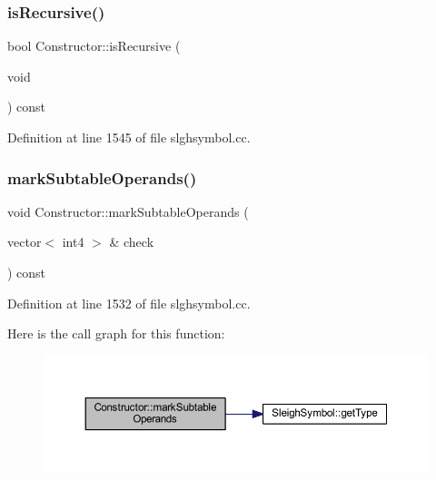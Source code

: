 \subsubsection{\texorpdfstring{isRecursive()}{isRecursive()}}
{\footnotesize\ttfamily bool Constructor\+::is\+Recursive (\begin{DoxyParamCaption}\item[{void}]{ }\end{DoxyParamCaption}) const}



Definition at line 1545 of file slghsymbol.\+cc.

\mbox{\label{class_constructor_a3a9bcc286d18c9d05de32509c5d6f0c4}} 
\subsubsection{\texorpdfstring{markSubtableOperands()}{markSubtableOperands()}}
{\footnotesize\ttfamily void Constructor\+::mark\+Subtable\+Operands (\begin{DoxyParamCaption}\item[{vector$<$ int4 $>$ \&}]{check }\end{DoxyParamCaption}) const}



Definition at line 1532 of file slghsymbol.\+cc.

Here is the call graph for this function\+:
\nopagebreak
\begin{figure}[H]
\begin{center}
\leavevmode
\includegraphics[width=350pt]{class_constructor_a3a9bcc286d18c9d05de32509c5d6f0c4_cgraph}
\end{center}
\end{figure}
\mbox{\label{class_constructor_af054ebc974542915d6bba232796984d7}} 
